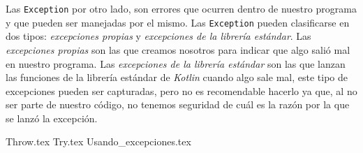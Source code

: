   Las \texttt{Exception} por otro lado, son errores que ocurren dentro de nuestro programa y que 
  pueden ser manejadas por el mismo.
  Las \texttt{Exception} pueden clasificarse en dos tipos: \textit{excepciones propias} y
  \textit{excepciones de la librería estándar}.
  Las \textit{excepciones propias} son las que creamos nosotros para indicar que algo salió mal
  en nuestro programa.
  Las \textit{excepciones de la librería estándar} son las que lanzan las funciones de la librería
  estándar de \textit{Kotlin} cuando algo sale mal, este tipo de excepciones pueden ser capturadas,
  pero no es recomendable hacerlo ya que, al no ser parte de nuestro código, no tenemos seguridad
  de cuál es la razón por la que se lanzó la excepción.

  {Throw.tex}
  {Try.tex}
  {Usando_excepciones.tex}